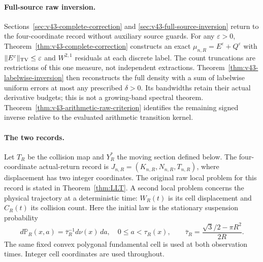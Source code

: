 \documentclass[11pt,reqno]{amsart}
\numberwithin{equation}{section}
\theoremstyle{definition}\newtheorem{definition}[theorem]{Definition}
\theoremstyle{remark}\newtheorem{remark}[theorem]{Remark}
\begin{document}
\paragraph{Full-source raw inversion.}
Sections~\ref{sec:v43-complete-correction} and
\ref{sec:v43-full-source-inversion} return to the four-coordinate
record without auxiliary source guards. For any $\varepsilon>0$,
Theorem~\ref{thm:v43-complete-correction} constructs an exact
$\mu_{n,R}=E^\varepsilon+Q^\varepsilon$ with
$\|E^\varepsilon\|_{\operatorname{TV}}\le\varepsilon$ and $W^{2,1}$ residuals
at each discrete label. The count truncations are restrictions of this
one measure, not independent extractions. Theorem~\ref{thm:v43-labelwise-inversion}
then reconstructs the full density with a sum of labelwise uniform
errors at most any prescribed $\delta>0$. Its bandwidths retain their
actual derivative budgets; this is not a growing-band spectral theorem.
Theorem~\ref{thm:v43-arithmetic-raw-criterion} identifies the remaining
signed inverse relative to the evaluated arithmetic transition kernel.

\paragraph{The two records.}
Let $T_R$ be the collision map and $Y_R^*$ the moving section defined
below. The four-coordinate actual-return record is
$J_{n,R}=(K_{n,R},N_{n,R},T_{n,R})$, where displacement has two integer
coordinates. The original raw local problem for this record is stated
in Theorem~\ref{thm:LLT}. A second local problem concerns the physical
trajectory at a deterministic time: $W_R(t)$ is its cell displacement
and $C_R(t)$ its collision count. Here the initial law is the stationary
suspension probability
\[
 d\mathbb P_R(x,a)=\bar\tau_R^{-1}d\nu(x)\,da,
 \quad 0\le a<\tau_R(x),\qquad
 \bar\tau_R=\frac{\sqrt3/2-\pi R^2}{2R}.
\]
The same fixed convex polygonal fundamental cell is used at both
observation times. Integer cell coordinates are used throughout.
\end{document}
